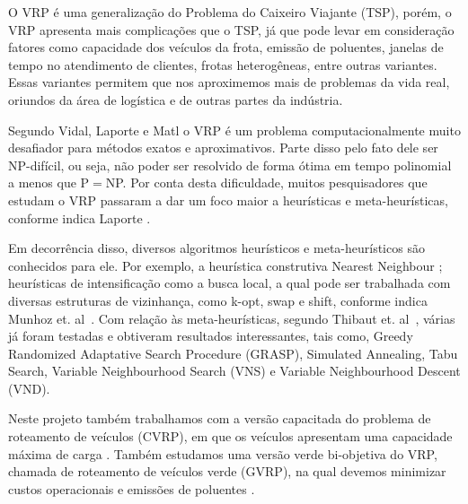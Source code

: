 \documentclass[12pt, a4paper]{article}
\begin{document}
O VRP é uma generalização do Problema do Caixeiro Viajante (TSP), porém,  
o VRP apresenta mais complicações que o TSP, já que pode levar em consideração fatores como capacidade dos veículos da frota, emissão de poluentes, janelas de tempo no atendimento de clientes, frotas heterogêneas, entre outras variantes. Essas variantes permitem que nos aproximemos mais de problemas da vida real, oriundos da área de logística e de outras partes da indústria.

Segundo Vidal, Laporte e Matl \cite{vidal2020concise} o VRP é um problema computacionalmente muito desafiador para métodos exatos e aproximativos. Parte disso pelo fato dele ser NP-difícil, ou seja, não poder ser resolvido de forma ótima em tempo polinomial a menos que P$=$NP. Por conta desta dificuldade, muitos pesquisadores que estudam o VRP passaram a dar um foco maior a heurísticas e meta-heurísticas, conforme indica Laporte \cite{laporte2009fifty}. 

Em decorrência disso, diversos algoritmos heurísticos e meta-heurísticos são conhecidos para ele.
%
Por exemplo, a heurística construtiva Nearest Neighbour \cite{joshi2015nearest}; heurísticas de intensificação como a busca local, a qual pode ser trabalhada com diversas estruturas de vizinhança, como k-opt, swap e shift, conforme indica Munhoz et. al~\cite{munhoz2018general}.
%
Com relação às meta-heurísticas, segundo Thibaut et. al~\cite{vidal2013heuristics}, várias já foram testadas e obtiveram resultados interessantes, tais como, Greedy Randomized Adaptative Search Procedure (GRASP), Simulated Annealing, Tabu Search, Variable Neighbourhood Search (VNS) e Variable Neighbourhood Descent (VND).

Neste projeto também trabalhamos com a versão capacitada do problema de roteamento de veículos (CVRP), em que os veículos apresentam uma capacidade máxima de carga \cite{eksioglu2009vehicle}.
Também estudamos uma versão verde bi-objetiva do VRP, chamada de roteamento de veículos verde (GVRP), na qual devemos minimizar custos operacionais e emissões de poluentes \cite{lin2014survey}.

\end{document}
